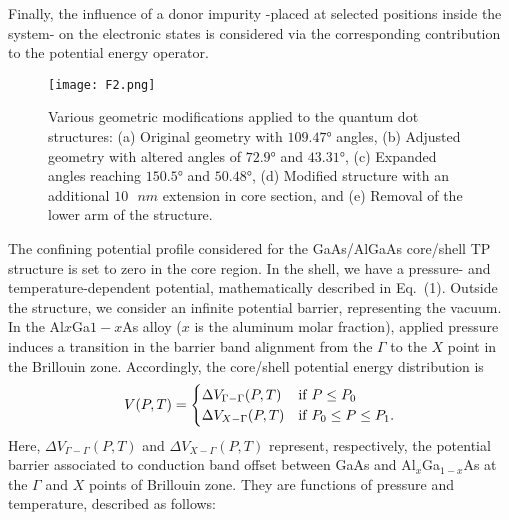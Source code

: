 \documentclass[nanomaterials,article,submit,moreauthors,pdftex]{Definitions/mdpi}
\begin{document}
Finally, the influence of a donor impurity -placed at selected positions inside the system- on the electronic states is considered via the corresponding contribution to the potential energy operator.

\begin{figure}[H]
    \centering
    \texttt{[image: F2.png]}
    \caption{Various geometric modifications applied to the quantum dot structures: (a) Original geometry with $109.47$° angles, (b) Adjusted geometry with altered angles of $72.9$° and $43.31$°, (c) Expanded angles reaching $150.5$° and $50.48$°, (d) Modified structure with an additional $10\text{ }nm$ extension in core section, and (e) Removal of the lower arm of the structure.}
    \label{F2}
\end{figure}

The confining potential profile considered for the GaAs/AlGaAs core/shell TP structure \cite{Yao2014} is set to zero in the core region. In the shell, we have a pressure- and temperature-dependent potential, mathematically described in Eq.~(1). Outside the structure, we consider an infinite potential barrier, representing the vacuum. In the Al$x$Ga${1-x}$As alloy ($x$ is the aluminum molar fraction), applied pressure induces a transition in the barrier band alignment from the $\Gamma$ to the $X$ point in the Brillouin zone. Accordingly, the core/shell potential energy distribution is
\begin{equation}
    V(P,T) = \begin{cases}
        \Delta V_{\Gamma-\Gamma}(P,T) & {\rm if}\;P \leq P_0 \\
        \Delta V_{X-\Gamma}(P,T) & {\rm if}\;P_0\leq P\leq P_1. \\
            \end{cases}
\end{equation}
Here,  
$\Delta V_{\Gamma-\Gamma}(P,T)$ and $\Delta V_{X-\Gamma}(P,T)$ represent, respectively, the potential barrier associated to conduction band offset between GaAs and Al$_{x}$Ga$_{1-x}$As  at the $\Gamma$ and $X$ points of Brillouin zone. They are functions of pressure and temperature, described as follows:
\end{document}
